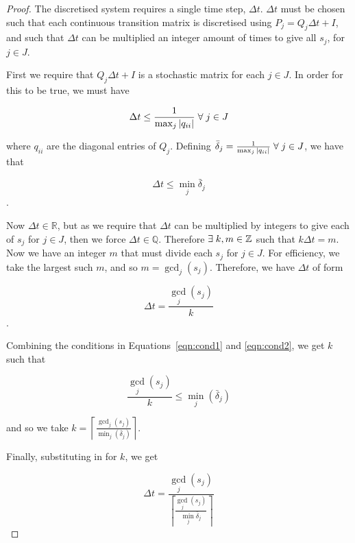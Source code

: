 \documentclass{article}
\begin{document}
\begin{proof}
The discretised system requires a single time step, $\Delta t$.
$\Delta t$ must be chosen such that each continuous transition matrix is discretised using $P_j = Q_j \Delta t + I$, and such that $\Delta t$ can be multiplied an integer amount of times to give all $s_j$, for $j \in J$.

First we require that $Q_j \Delta t + I$ is a stochastic matrix for each $j \in J$.
In order for this to be true, we must have

\begin{equation*}
\Delta t \leq \frac{1}{\max_j |q_{ii}|} \nonscript\; \forall \nonscript\; j \in J
\end{equation*}

where $q_{ii}$ are the diagonal entries of $Q_j$.
Defining $\bar{\delta}_j = \frac{1}{\max_j |q_{ii}|} \nonscript\; \forall \nonscript\; j \in J$, we have that

\begin{equation}\label{eqn:cond1}
\Delta t \leq \min_j \bar{\delta}_j
\end{equation}.

Now $\Delta t \in \mathbb{R}$, but as we require that $\Delta t$ can be multiplied by integers to give each of $s_j$ for $j \in J$, then we force $\Delta t \in \mathbb{Q}$.
Therefore $\exists \nonscript\; k, m \in \mathbb{Z}$ such that $k \Delta t = m$.
Now we have an integer $m$ that must divide each $s_j$ for $j \in J$.
For efficiency, we take the largest such $m$, and so $m = \gcd_j (s_j)$.
Therefore, we have $\Delta t$ of form

\begin{equation}\label{eqn:cond2}
\Delta t = \frac{\gcd_j(s_j)}{k}
\end{equation}.

Combining the conditions in Equations~\ref{eqn:cond1} and \ref{eqn:cond2}, we get $k$ such that

\begin{equation*}
\frac{\gcd_j(s_j)}{k} \leq \min_j(\bar{\delta}_j)
\end{equation*}

and so we take $k = \left\lceil \frac{\gcd_j(s_j)}{\min_j(\bar{\delta}_j)} \right\rceil$.

Finally, substituting in for $k$, we get

\begin{equation*}
\Delta t = \frac{\gcd_j(s_j)}{\left\lceil \frac{\gcd_j(s_j)}{\min_j \bar{\delta}_j} \right\rceil}
\end{equation*}

\end{proof}
\end{document}
